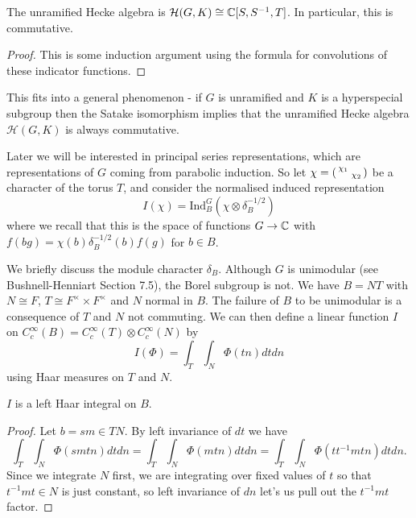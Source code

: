 \begin{lemma}
    The unramified Hecke algebra is $\mathcal H(G,K) \cong \mathbb{C}[S,S^{-1},T]$. In particular, this is commutative.
\end{lemma}
\begin{proof}
    This is some induction argument using the formula for convolutions of these indicator functions.
\end{proof}

\begin{rem}
    This fits into a general phenomenon - if $G$ is unramified and $K$ is a hyperspecial subgroup then the Satake isomorphism implies that the unramified Hecke algebra $\mathcal H(G,K)$ is always commutative.
\end{rem}

Later we will be interested in principal series representations, which are representations of $G$ coming from parabolic induction. So let $\chi = \begin{psmallmatrix}
    \chi_1 & \\ & \chi_2
\end{psmallmatrix}$ be a character of the torus $T$, and consider the normalised induced representation $$I(\chi) = \mathrm{Ind}_B^G \left( \chi \otimes \delta_B^{-1/2}\right)$$
where we recall that this is the space of functions $G \to \mathbb{C}$ with $f(bg) = \chi(b)\delta_B^{-1/2}(b) f(g)$ for $b \in B$.

We briefly discuss the module character $\delta_B$. Although $G$ is unimodular (see Bushnell-Henniart Section 7.5), the Borel subgroup is not. We have $B=NT$ with $N\cong F$, $T \cong F^\times \times F^\times$ and $N$ normal in $B$. The failure of $B$ to be unimodular is a consequence of $T$ and $N$ not commuting. We can then define a linear function $I$ on $C_c^\infty(B) = C_c^\infty(T) \otimes C_c^\infty(N)$ by
$$I(\Phi) = \int_T\int_N \Phi(tn) dt dn$$ using Haar measures on $T$ and $N$.

\begin{prop}
    $I$ is a left Haar integral on $B$.
\end{prop}
\begin{proof}
    Let $b=sm \in TN$. By left invariance of $dt$ we have
    $$\int_T\int_N \Phi(smtn)dtdn = \int_T\int_N \Phi(mtn)dtdn = \int_T\int_N \Phi(tt^{-1}mtn)dtdn.$$
    Since we integrate $N$ first, we are integrating over fixed values of $t$ so that $t^{-1}mt \in N$ is just constant, so left invariance of $dn$ let's us pull out the $t^{-1}mt$ factor.
\end{proof}

